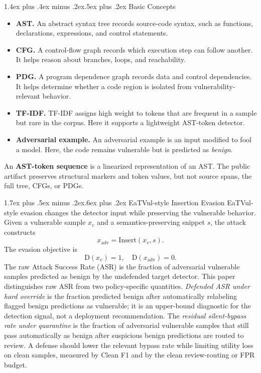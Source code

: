 \documentclass[letterpaper,twocolumn,10pt,twoside]{article}
\makeatletter
\renewcommand\subsection{\@startsection{subsection}{2}{\z@}%
  {1.7ex plus .5ex minus .2ex}{.6ex plus .2ex}%
  {\normalfont\normalsize\bfseries}}
\renewcommand\subsubsection{\@startsection{subsubsection}{3}{\z@}%
  {1.4ex plus .4ex minus .2ex}{.5ex plus .2ex}%
  {\normalfont\normalsize\bfseries}}
\newcommand{\cleanf}{Clean F1}
\newcommand{\asr}{Attack Success Rate (ASR)}
\newcommand{\asrshort}{ASR}
\makeatother
\begin{document}
\subsubsection{Basic Concepts}
\begin{itemize}
  \item \textbf{AST.} An abstract syntax tree records source-code syntax, such as functions, declarations, expressions, and control statements.
  \item \textbf{CFG.} A control-flow graph records which execution step can follow another. It helps reason about branches, loops, and reachability.
  \item \textbf{PDG.} A program dependence graph records data and control dependencies. It helps determine whether a code region is isolated from vulnerability-relevant behavior.
  \item \textbf{TF-IDF.} TF-IDF assigns high weight to tokens that are frequent in a sample but rare in the corpus. Here it supports a lightweight AST-token detector.
  \item \textbf{Adversarial example.} An adversarial example is an input modified to fool a model. Here, the code remains vulnerable but is predicted as \textit{benign}.
\end{itemize}
An \textbf{AST-token sequence} is a linearized representation of an AST. The public artifact preserves structural markers and token values, but not source spans, the full tree, CFGs, or PDGs.

\subsection{EaTVul-style Insertion Evasion}
EaTVul-style evasion changes the detector input while preserving the vulnerable behavior. Given a vulnerable sample $x_{v}$ and a semantics-preserving snippet $s$, the attack constructs
\begin{equation}
  x_{\mathrm{adv}} = \text{Insert}(x_{v}, s).
  \label{eq:insert}
\end{equation}
The evasion objective is
\begin{equation}
  \mathrm{D}(x_{v}) = 1,\quad \mathrm{D}(x_{\mathrm{adv}}) = 0.
  \label{eq:evasion}
\end{equation}
The raw \asr{} is the fraction of adversarial vulnerable samples predicted as benign by the undefended target detector. This paper distinguishes raw \asrshort{} from two policy-specific quantities. \textit{Defended \asrshort{} under hard override} is the fraction predicted benign after automatically relabeling flagged benign predictions as vulnerable; it is an upper-bound diagnostic for the detection signal, not a deployment recommendation. The \textit{residual silent-bypass rate under quarantine} is the fraction of adversarial vulnerable samples that still pass automatically as benign after suspicious benign predictions are routed to review. A defense should lower the relevant bypass rate while limiting utility loss on clean samples, measured by \cleanf{} and by the clean review-routing or FPR budget.
\end{document}

